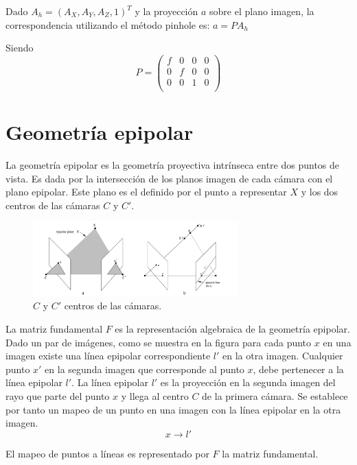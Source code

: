 Dado $A_h = (A_X,A_Y,A_Z,1)^T$ y la proyección $a$ sobre el plano imagen, la correspondencia utilizando el método pinhole es:
$a=PA_h$

Siendo
\[
P = 
\begin{pmatrix}
f & 0 & 0 & 0 \\
0 & f & 0 & 0 \\
0 & 0 & 1 & 0 \\
\end{pmatrix}
\]

\section{Geometría epipolar}
La geometría epipolar\cite{LibroCompGrafica3} es la geometría proyectiva intrínseca entre dos puntos de vista. Es dada por la intersección de los planos imagen de cada cámara con el plano epipolar. Este plano es el definido por el punto a representar $X$ y los dos centros de las cámaras $C$ y $C'$.

\begin{figure}[H]
  \centering
    \includegraphics[width=0.7\textwidth]{./Cap2_videomapping/epipolar.PNG}
  \caption[Multiple View Geometry in Computer Vision, Fig. 9.1]{$C$ y $C'$ centros de las cámaras.}
  \label{fig:Epipolar}
\end{figure}
La matriz fundamental $F$ es la representación algebraica de la geometría epipolar.
Dado un par de imágenes, como se muestra en la figura para cada punto $x$ en una imagen existe una línea epipolar correspondiente $l'$ en la otra imagen. Cualquier punto $x'$ en la segunda imagen que corresponde al punto $x$, debe pertenecer a la línea epipolar $l'$.
La línea epipolar $l'$ es la proyección en la segunda imagen del rayo que parte del punto $x$ y llega al centro $C$ de la primera cámara. Se establece por tanto un mapeo de un punto en una imagen con la línea epipolar en la otra imagen.
\[  x \to l'
\]
 
El mapeo de puntos a líneas es representado por $F$ la matriz fundamental.


